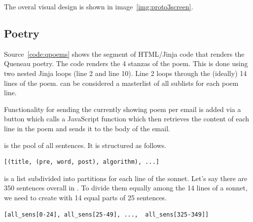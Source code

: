 The overal visual design is shown in image~\ref{img:proto3screen}.


\subsection{Poetry}
\label{s:poetry}

Source~\ref{code:qpoems} shows the segment of \ac{HTML}/Jinja code that renders the Queneau poetry. The code renders the 4 stanzas of the poem. This is done using two nested Jinja  loops (line 2 and line 10). Line 2 loops through the (ideally) 14 lines of the poem.  can be considered a masterlist of all sublists for each poem line.

Functionality for sending the currently showing poem per email is added via a button which calls a JavaScript function  which then retrieves the content of each line in the poem and sends it to the body of the email. 

 is the pool of all sentences. It is structured as follows.

\begin{verbatim}
[(title, (pre, word, post), algorithm), ...]
\end{verbatim}

 is a list subdivided into partitions for each line of the sonnet. Let's say there are 350 sentences overall in . To divide them equally among the 14 lines of a sonnet, we need to create  with 14 equal parts of 25 sentences.

\begin{verbatim}
[all_sens[0-24], all_sens[25-49], ...,  all_sens[325-349]]
\end{verbatim}


